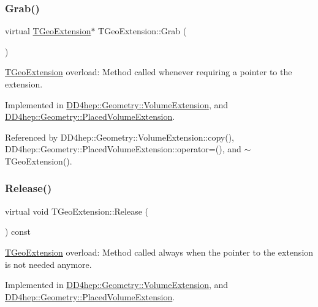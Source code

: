 \subsubsection{\texorpdfstring{Grab()}{Grab()}}
{\footnotesize\ttfamily virtual \hyperlink{class_t_geo_extension}{T\+Geo\+Extension}$\ast$ T\+Geo\+Extension\+::\+Grab (\begin{DoxyParamCaption}{ }\end{DoxyParamCaption})\hspace{0.3cm}{\ttfamily [pure virtual]}}



\hyperlink{class_t_geo_extension}{T\+Geo\+Extension} overload\+: Method called whenever requiring a pointer to the extension. 



Implemented in \hyperlink{class_d_d4hep_1_1_geometry_1_1_volume_extension_adc072e1c3a4be273940579938c6be398}{D\+D4hep\+::\+Geometry\+::\+Volume\+Extension}, and \hyperlink{class_d_d4hep_1_1_geometry_1_1_placed_volume_extension_aa5261b49a18fba980e00d96161db3855}{D\+D4hep\+::\+Geometry\+::\+Placed\+Volume\+Extension}.



Referenced by D\+D4hep\+::\+Geometry\+::\+Volume\+Extension\+::copy(), D\+D4hep\+::\+Geometry\+::\+Placed\+Volume\+Extension\+::operator=(), and $\sim$\+T\+Geo\+Extension().

\hypertarget{class_t_geo_extension_af3013d9059744f1d7f9f9037a57bf3da}{}\label{class_t_geo_extension_af3013d9059744f1d7f9f9037a57bf3da} 
\subsubsection{\texorpdfstring{Release()}{Release()}}
{\footnotesize\ttfamily virtual void T\+Geo\+Extension\+::\+Release (\begin{DoxyParamCaption}{ }\end{DoxyParamCaption}) const\hspace{0.3cm}{\ttfamily [pure virtual]}}



\hyperlink{class_t_geo_extension}{T\+Geo\+Extension} overload\+: Method called always when the pointer to the extension is not needed anymore. 



Implemented in \hyperlink{class_d_d4hep_1_1_geometry_1_1_volume_extension_a9351245472026a410a0b3d1c95c1302e}{D\+D4hep\+::\+Geometry\+::\+Volume\+Extension}, and \hyperlink{class_d_d4hep_1_1_geometry_1_1_placed_volume_extension_a7a32d8e82885c18e196ff79349e58737}{D\+D4hep\+::\+Geometry\+::\+Placed\+Volume\+Extension}.



